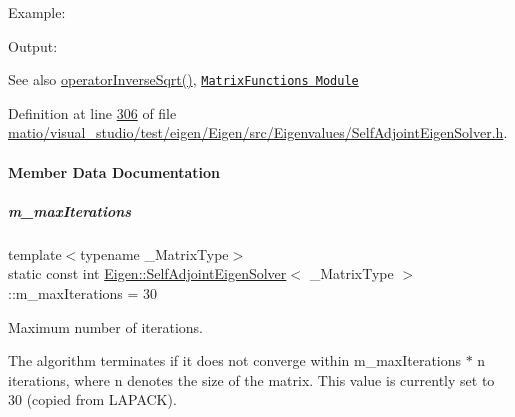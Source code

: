 Example\+: 
\begin{DoxyCodeInclude}
\end{DoxyCodeInclude}
 Output\+: 
\begin{DoxyVerbInclude}
\end{DoxyVerbInclude}


\begin{DoxySeeAlso}{See also}
\hyperlink{group___eigenvalues___module_a71fe0aea0b22d176efcea556c5c160f5}{operator\+Inverse\+Sqrt()}, \href{unsupported/group__MatrixFunctions__Module.html}{\tt Matrix\+Functions Module} 
\end{DoxySeeAlso}


Definition at line \hyperlink{matio_2visual__studio_2test_2eigen_2_eigen_2src_2_eigenvalues_2_self_adjoint_eigen_solver_8h_source_l00306}{306} of file \hyperlink{matio_2visual__studio_2test_2eigen_2_eigen_2src_2_eigenvalues_2_self_adjoint_eigen_solver_8h_source}{matio/visual\+\_\+studio/test/eigen/\+Eigen/src/\+Eigenvalues/\+Self\+Adjoint\+Eigen\+Solver.\+h}.



\paragraph{Member Data Documentation}
\mbox{\label{group___eigenvalues___module_a0567341a66a61e2c8891f7cdd1e4505c}} 
\subparagraph{\texorpdfstring{m\+\_\+max\+Iterations}{m\_maxIterations}}
{\footnotesize\ttfamily template$<$typename \+\_\+\+Matrix\+Type$>$ \\
static const int \hyperlink{group___eigenvalues___module_class_eigen_1_1_self_adjoint_eigen_solver}{Eigen\+::\+Self\+Adjoint\+Eigen\+Solver}$<$ \+\_\+\+Matrix\+Type $>$\+::m\+\_\+max\+Iterations = 30\hspace{0.3cm}{\ttfamily [static]}}



Maximum number of iterations. 

The algorithm terminates if it does not converge within m\+\_\+max\+Iterations $\ast$ n iterations, where n denotes the size of the matrix. This value is currently set to 30 (copied from L\+A\+P\+A\+CK). 

